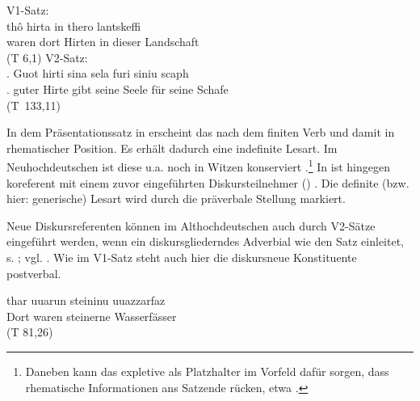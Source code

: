 \begin{exe}
	\ex \label{ex:ahd-is}   
	\begin{xlist}
		\ex \label{ex:ahd-is-indef} V1-Satz:\\
		\gll {} thô hirta in thero lantskeffi   \\
		waren dort Hirten in dieser Landschaft\\
	\trans {} 
	(T 6,1)
	\ex \label{ex:ahd-is-def} V2-Satz:\\
		. Guot hirti  sina sela furi siniu scaph \\
		[Ich bin guter Hirte]. guter Hirte gibt seine Seele für seine Schafe\\
	\trans {} (T~133,11)

		\end{xlist}
\end{exe}

\noindent
In dem Präsentationssatz in  erscheint das   nach dem finiten Verb  und damit in rhematischer  Position. Es erhält dadurch eine indefinite  Lesart. Im Neuhochdeutschen ist diese  u.a. noch in Witzen konserviert \parencite[, vgl.][83]{Ramers2005}.\footnote{Daneben kann das expletive  als Platzhalter im Vorfeld dafür sorgen, dass rhematische  Informationen ans Satzende rücken, etwa  \parencite[s.][]{Hauenschild1993}.} In  ist  hingegen koreferent mit einem zuvor eingeführten Diskursteilnehmer () \parencite[vgl. auch][]{Solf2008}. Die definite (bzw. hier: generische)  Lesart wird durch die präverbale Stellung markiert.  

Neue Diskursreferenten können im Althochdeutschen auch durch V2-Sätze eingeführt werden, wenn ein diskursgliederndes Adverbial  wie    den Satz einleitet, s. ; vgl. \textcite[152]{Hinterholzl2005}. Wie im V1-Satz steht auch hier die diskursneue Konstituente postverbal. 

\begin{exe} 
\ex \label{ex:v2-tho} 
\gll thar uuarun steininu uuazzarfaz \\
	Dort waren steinerne Wasserfässer \\
	\trans {} (T 81,26)
\end{exe}

